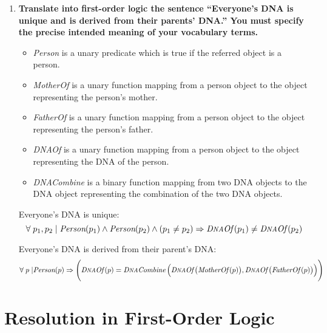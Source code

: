 \begin{enumerate}
\item \textbf{Translate into first-order logic the sentence ``Everyone's DNA is unique and is derived from their parents' DNA.'' You must specify the precise intended meaning of your vocabulary terms.}

\begin{itemize}
\item \textit{Person} is a unary predicate which is true if the referred object is a person.
\item \textit{MotherOf} is a unary function mapping from a person object to the object representing the person's mother.
\item \textit{FatherOf} is a unary function mapping from a person object to the object representing the person's father.
\item \textit{D{\footnotesize NA}Of\thinspace} is a unary function mapping from a person object to the object representing the DNA of the person.
\item \textit{D{\footnotesize NA}Combine\thinspace} is a binary function mapping from two DNA objects to the DNA object representing the combination of the two DNA objects.
\end{itemize}

Everyone's DNA is unique:
\begin{displaymath}
\forall \; p_1, p_2 \; | \; \textit{Person}(p_1) \land \textit{Person}(p_2) \land (p_1 \neq p_2) \Rightarrow \textit{D{\footnotesize NA}Of\thinspace}(p_1) \neq \textit{D{\footnotesize NA}Of\thinspace}(p_2)
\end{displaymath}

Everyone's DNA is derived from their parent's DNA:
\begin{displaymath}
\forall \; p \; | \textit{Person}(p) \Rightarrow \Bigg(\textit{D{\footnotesize NA}Of\thinspace}(p) = \textit{D{\footnotesize NA}Combine\thinspace}\Big(\textit{D{\footnotesize NA}Of\thinspace}\big(\textit{MotherOf\thinspace}(p)\big), \textit{D{\footnotesize NA}Of\thinspace}\big(\textit{FatherOf\thinspace}(p)\big)\Big)\Bigg)
\end{displaymath}

\end{enumerate}

\section{Resolution in First-Order Logic}

